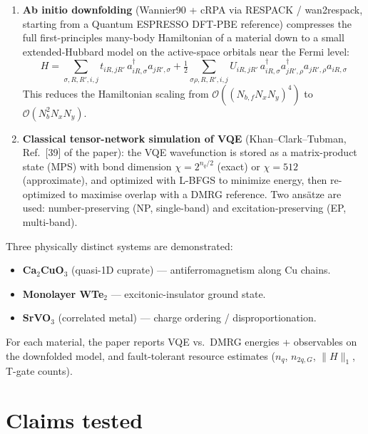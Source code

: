 \documentclass[11pt]{article}
\begin{document}
\begin{enumerate}
    \item \textbf{Ab initio downfolding} (Wannier90 + cRPA via RESPACK / wan2respack, starting from a Quantum ESPRESSO DFT-PBE reference) compresses the full first-principles many-body Hamiltonian of a material down to a small extended-Hubbard model on the active-space orbitals near the Fermi level:
    \begin{equation}
    H = \sum_{\sigma,R,R',i,j} t_{iR,jR'}\, a^{\dagger}_{iR,\sigma} a_{jR',\sigma}
      + \tfrac{1}{2}\!\!\!\sum_{\sigma\rho,R,R',i,j}\!\! U_{iR,jR'}\, a^{\dagger}_{iR,\sigma} a^{\dagger}_{jR',\rho} a_{jR',\rho} a_{iR,\sigma}
    \label{eq:extHubbard}
    \end{equation}
    This reduces the Hamiltonian scaling from $\mathcal{O}((N_{b,f} N_x N_y)^4)$ to $\mathcal{O}(N_b^2 N_x N_y)$.

    \item \textbf{Classical tensor-network simulation of VQE} (Khan--Clark--Tubman, Ref.~[39] of the paper): the VQE wavefunction is stored as a matrix-product state (MPS) with bond dimension $\chi = 2^{n_q/2}$ (exact) or $\chi = 512$ (approximate), and optimized with L-BFGS to minimize energy, then re-optimized to maximise overlap with a DMRG reference. Two ans\"atze are used: number-preserving (NP, single-band) and excitation-preserving (EP, multi-band).
\end{enumerate}

\noindent Three physically distinct systems are demonstrated:
\begin{itemize}
    \item \textbf{Ca$_2$CuO$_3$} (quasi-1D cuprate) --- antiferromagnetism along Cu chains.
    \item \textbf{Monolayer WTe$_2$} --- excitonic-insulator ground state.
    \item \textbf{SrVO$_3$} (correlated metal) --- charge ordering / disproportionation.
\end{itemize}

For each material, the paper reports VQE vs.\ DMRG energies + observables on the downfolded model, and fault-tolerant resource estimates ($n_q$, $n_{2q,G}$, $\|H\|_1$, T-gate counts).

\section{Claims tested}
\end{document}
